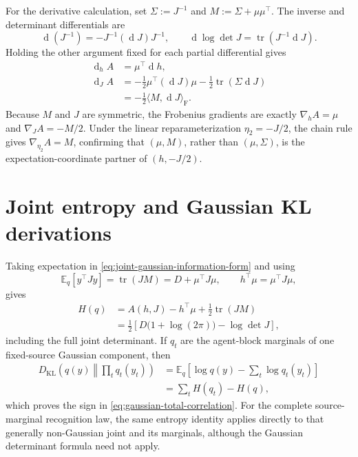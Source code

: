 For the derivative calculation, set $\Sigma:=J^{-1}$ and $M:=\Sigma+\mu\mu^\top$.  The inverse and determinant differentials are
\begin{equation}
\mathop{\mathrm d}(J^{-1})
=-J^{-1}(\mathop{\mathrm d}J)J^{-1},
\qquad
\mathop{\mathrm d}\log\det J
=\operatorname{tr}(J^{-1}\mathop{\mathrm d}J).
\label{eq:inverse-logdet-differentials}
\end{equation}
Holding the other argument fixed for each partial differential gives
\begin{equation}
\begin{aligned}
\mathop{\mathrm d}_hA
&=\mu^\top\mathop{\mathrm d}h,\\
\mathop{\mathrm d}_JA
&=-\frac12\mu^\top(\mathop{\mathrm d}J)\mu
-\frac12\operatorname{tr}(\Sigma\mathop{\mathrm d}J)\\
&=-\frac12\langle M,\mathop{\mathrm d}J\rangle_{\mathrm F}.
\end{aligned}
\label{eq:log-normalizer-differential-proof}
\end{equation}
Because $M$ and $J$ are symmetric, the Frobenius gradients are exactly $\nabla_hA=\mu$ and $\nabla_JA=-M/2$.  Under the linear reparameterization $\eta_2=-J/2$, the chain rule gives $\nabla_{\eta_2}A=M$, confirming that $(\mu,M)$, rather than $(\mu,\Sigma)$, is the expectation-coordinate partner of $(h,-J/2)$.

\section{Joint entropy and Gaussian KL derivations}

Taking expectation in \cref{eq:joint-gaussian-information-form} and using
\begin{equation}
\mathbb E_q[y^\top Jy]
=\operatorname{tr}(JM)
=D+\mu^\top J\mu,
\qquad
h^\top\mu=\mu^\top J\mu,
\label{eq:gaussian-quadratic-expectation}
\end{equation}
gives
\begin{equation}
\begin{aligned}
H(q)
&=A(h,J)-h^\top\mu
+\frac12\operatorname{tr}(JM)\\
&=\frac12
\left[D\bigl(1+\log(2\pi)\bigr)-\log\det J\right],
\end{aligned}
\label{eq:joint-entropy-derivation}
\end{equation}
including the full joint determinant. If $q_t$ are the agent-block marginals of one fixed-source Gaussian component, then
\begin{equation}
\begin{aligned}
D_{\mathrm{KL}}
\left(q(y)\middle\Vert\prod_tq_t(y_t)\right)
&=\mathbb E_q\left[
\log q(y)-\sum_t\log q_t(y_t)
\right]\\
&=\sum_tH(q_t)-H(q),
\end{aligned}
\label{eq:total-correlation-entropy-proof}
\end{equation}
which proves the sign in \cref{eq:gaussian-total-correlation}. For the complete source-marginal recognition law, the same entropy identity applies directly to that generally non-Gaussian joint and its marginals, although the Gaussian determinant formula need not apply.

